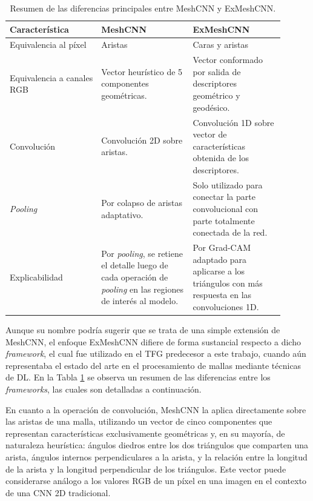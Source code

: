 \begin{table}[h]
    \centering
    \begin{tabular}{|p{0.3\linewidth}|p{0.3\linewidth}|p{0.3\linewidth}|}
    \hline
    \rowcolor[HTML]{D33333} 
    {\color[HTML]{FFFFFF} \textbf{Característica}} & {\color[HTML]{FFFFFF} \textbf{MeshCNN}} & {\color[HTML]{FFFFFF} \textbf{ExMeshCNN}} \\ \hline
    Equivalencia al píxel & Aristas & Caras y aristas \\ \hline
    Equivalencia a canales RGB & Vector heurístico de 5 componentes geométricas. & Vector conformado por salida de descriptores geométrico y geodésico. \\ \hline
    Convolución & Convolución 2D sobre aristas. & Convolución 1D sobre vector de características obtenida de los descriptores. \\ \hline
    \textit{Pooling} & Por colapso de aristas adaptativo. & Solo utilizado para conectar la parte convolucional con parte totalmente conectada de la red. \\ \hline
    Explicabilidad & Por \textit{pooling}, se retiene el detalle luego de cada operación de \textit{pooling} en las regiones de interés al modelo. & Por Grad-CAM adaptado para aplicarse a los triángulos con más respuesta en las convoluciones 1D. \\ \hline
    \end{tabular}
    \caption[Resumen de las diferencias entre MeshCNN y ExMeshCNN]{Resumen de las diferencias principales entre MeshCNN y ExMeshCNN.}
    \label{meshcnn_vs_exmeshcnn}
\end{table}

Aunque su nombre podría sugerir que se trata de una simple extensión de MeshCNN, el enfoque ExMeshCNN difiere de forma sustancial respecto a dicho \textit{framework}, el cual fue utilizado en el TFG predecesor a este trabajo, cuando aún representaba el estado del arte en el procesamiento de mallas mediante técnicas de DL. En la Tabla \ref{meshcnn_vs_exmeshcnn} se observa un resumen de las diferencias entre los \textit{frameworks}, las cuales son detalladas a continuación.

En cuanto a la operación de convolución, MeshCNN la aplica directamente sobre las aristas de una malla, utilizando un vector de cinco componentes que representan características exclusivamente geométricas y, en su mayoría, de naturaleza heurística: ángulos diedros entre los dos triángulos que comparten una arista, ángulos internos perpendiculares a la arista, y la relación entre la longitud de la arista y la longitud perpendicular de los triángulos. Este vector puede considerarse análogo a los valores RGB de un píxel en una imagen en el contexto de una CNN 2D tradicional.

